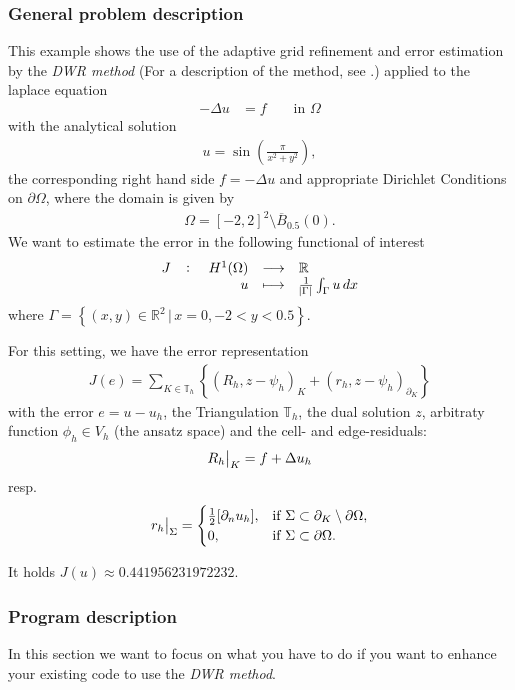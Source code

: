 \subsubsection{General problem description}
This example shows the use of the adaptive grid refinement and error estimation by the \textit{DWR method} (For a description of the method, see \cite{BR03}.) applied to the laplace equation 
\begin{align*}
-\Delta u &= f && \text{ in } \Omega
\end{align*}
with the analytical solution
\begin{align*}
u = \sin\left(\frac{\pi}{x^2 + y^2}\right),
\end{align*}
 the corresponding right hand side $f = -\Delta u$ and appropriate Dirichlet Conditions on $\partial \Omega$, where the domain is given by
\begin{align*}
\Omega = [-2,2]^2\setminus \overline{B}_{0.5}(0).
\end{align*}
We want to estimate the error in the following functional of interest
$$\fullfunction{J}{H^1(\Omega)}{\mathbb{R}}{u}{\frac 1 {\abs{\Gamma}} \int_\Gamma u \,dx}$$
where
$\Gamma = \left\{(x,y)\in \mathbb R ^2\,\big | \,x=0,-2<y<0.5 \right \}$.

For this setting, we have the error representation
\begin{align}\label{dwr.error_identity}
J(e)=\sum_{K\in \mathbb T _h} \left\{(R_h, z-\psi_h)_K + (r_h, z-\psi_h)_{\partial_K}\right\}
\end{align}
with the error $e=u-u_h$, the Triangulation $\mathbb T_h$, the dual solution $z$, arbitraty function $\phi_h \in V_h$ (the ansatz space) and the cell- and edge-residuals: 
\begin{align}\label{dwr.cell_residual}
\eval[1]{R_h}_{K} = f+\Delta u_h
\end{align}
resp. 
\begin{align}\label{dwr.edge_residual}
\eval[1]{r_h}_{\Sigma} =
\begin{cases}
\frac 12 [\partial_n u_h] ,&\text{if } \Sigma \subset \partial_K \setminus \partial \Omega,\\
0,& \text{if } \Sigma \subset\partial \Omega.
\end{cases}
\end{align}

It holds $J(u) \approx 0.441956231972232$.
\subsubsection{Program description}
In this section we want to focus on what you have to do if you want to enhance your existing code to use the \textit{DWR method}.


